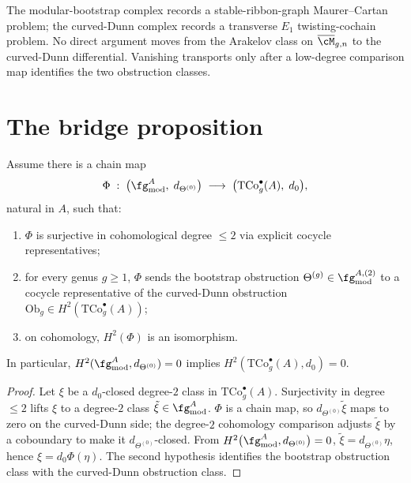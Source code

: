 \begin{remark}
\label{rem:two-complex-fm67}
The modular-bootstrap complex records a stable-ribbon-graph
Maurer--Cartan problem; the curved-Dunn complex records a transverse
\(E_{1}\) twisting-cochain problem. No direct argument moves from
the Arakelov class on \(\overline{\cM}_{g,n}\) to the curved-Dunn
differential. Vanishing transports only after a low-degree
comparison map identifies the two obstruction classes.
\end{remark}

\section{The bridge proposition}
\label{sec:bridge}

\begin{proposition}
\label{prop:modular-bootstrap-to-curved-dunn-bridge}
Assume there is a chain map
\[
 \Phi\;:\;
 \bigl(\fg^{A}_{\mathrm{mod}},\; d_{\Theta^{(0)}}\bigr)
 \;\longrightarrow\;
 \bigl(\mathrm{TCo}^{\bullet}_{g}(A),\; d_{0}\bigr),
\]
natural in \(A\), such that:
\begin{enumerate}
 \item \(\Phi\) is surjective in cohomological degree \(\le 2\) via
 explicit cocycle representatives;
 \item for every genus \(g \ge 1\), \(\Phi\) sends the bootstrap
 obstruction \(\Theta^{(g)} \in \fg^{A,(2)}_{\mathrm{mod}}\) to a
 cocycle representative of the curved-Dunn obstruction
 \(\mathrm{Ob}_{g} \in H^{2}(\mathrm{TCo}^{\bullet}_{g}(A))\);
 \item on cohomology, \(H^{2}(\Phi)\) is an isomorphism.
\end{enumerate}
In particular, \(H^{2}(\fg^{A}_{\mathrm{mod}}, d_{\Theta^{(0)}}) = 0\)
implies \(H^{2}(\mathrm{TCo}^{\bullet}_{g}(A), d_{0}) = 0\).
\end{proposition}

\begin{proof}
Let \(\xi\) be a \(d_{0}\)-closed degree-\(2\) class in
\(\mathrm{TCo}^{\bullet}_{g}(A)\). Surjectivity in degree \(\le 2\)
lifts \(\xi\) to a degree-\(2\) class \(\tilde{\xi} \in
\fg^{A}_{\mathrm{mod}}\). \(\Phi\) is a chain map, so
\(d_{\Theta^{(0)}}\tilde{\xi}\) maps to zero on the curved-Dunn
side; the degree-\(2\) cohomology comparison adjusts
\(\tilde{\xi}\) by a coboundary to make it
\(d_{\Theta^{(0)}}\)-closed. From
\(H^{2}\bigl(\fg^{A}_{\mathrm{mod}}, d_{\Theta^{(0)}}\bigr)=0\),
\(\tilde{\xi}=d_{\Theta^{(0)}}\eta\), hence
\(\xi=d_{0}\Phi(\eta)\). The second hypothesis identifies the
bootstrap obstruction class with the curved-Dunn obstruction class.
\end{proof}

